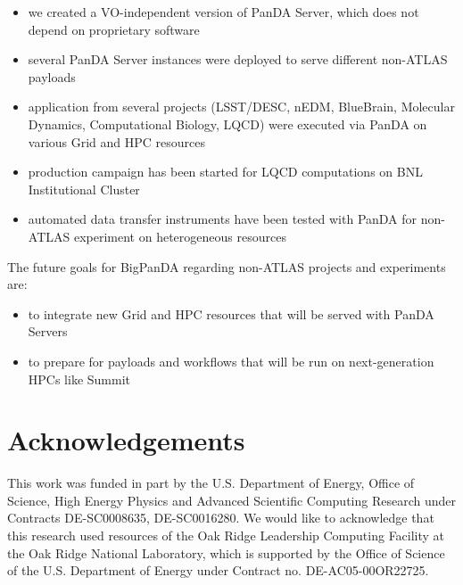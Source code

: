 \documentclass{webofc}
\begin{document}
\begin{itemize}
	\item we created a VO-independent version of PanDA Server, which does not 	depend on proprietary software
	\item several PanDA Server instances were deployed to serve different non-ATLAS payloads
	\item application from several projects (LSST/DESC, nEDM, BlueBrain, Molecular Dynamics, Computational Biology, LQCD) were executed via PanDA on various Grid and HPC resources
	\item production campaign has been started for LQCD computations on BNL Institutional Cluster
	\item automated data transfer instruments have been tested with PanDA for non-ATLAS experiment on heterogeneous resources
\end{itemize}

The future goals for BigPanDA regarding non-ATLAS projects and experiments are:

\begin{itemize}
	\item to integrate new Grid and HPC resources that will be served with PanDA Servers
	\item to prepare for payloads and workflows that will be run on next-generation HPCs like Summit
\end{itemize}

\section{Acknowledgements}

This work was funded in part by the U.S. Department of Energy, Office of Science, High Energy Physics and Advanced Scientific Computing Research under Contracts DE-SC0008635, DE-SC0016280. We would like to acknowledge that this research used resources of the Oak Ridge Leadership Computing Facility at the Oak Ridge National Laboratory, which is supported by the Office of Science of the U.S. Department of Energy under Contract no. DE-AC05-00OR22725.


%

\end{document}
